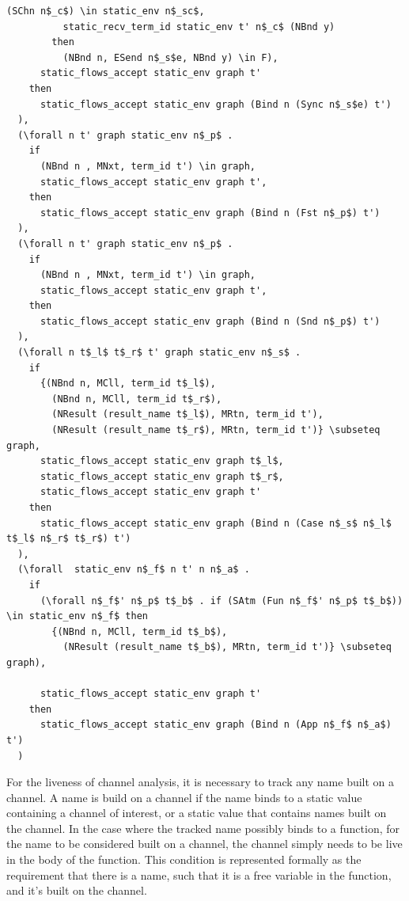 \documentclass[10pt]{article}
\begin{document}
\begin{lstlisting}[language=logic, mathescape]
          (SChn n$_c$) \in static_env n$_sc$,
          static_recv_term_id static_env t' n$_c$ (NBnd y)
        then
          (NBnd n, ESend n$_s$e, NBnd y) \in F),
      static_flows_accept static_env graph t'
    then
      static_flows_accept static_env graph (Bind n (Sync n$_s$e) t')
  ),
  (\forall n t' graph static_env n$_p$ .
    if
      (NBnd n , MNxt, term_id t') \in graph,
      static_flows_accept static_env graph t',
    then
      static_flows_accept static_env graph (Bind n (Fst n$_p$) t')
  ),
  (\forall n t' graph static_env n$_p$ .
    if
      (NBnd n , MNxt, term_id t') \in graph,
      static_flows_accept static_env graph t',
    then
      static_flows_accept static_env graph (Bind n (Snd n$_p$) t')
  ),
  (\forall n t$_l$ t$_r$ t' graph static_env n$_s$ .
    if
      {(NBnd n, MCll, term_id t$_l$),
        (NBnd n, MCll, term_id t$_r$),
        (NResult (result_name t$_l$), MRtn, term_id t'),
        (NResult (result_name t$_r$), MRtn, term_id t')} \subseteq graph,
      static_flows_accept static_env graph t$_l$,
      static_flows_accept static_env graph t$_r$,
      static_flows_accept static_env graph t'
    then
      static_flows_accept static_env graph (Bind n (Case n$_s$ n$_l$ t$_l$ n$_r$ t$_r$) t')
  ),
  (\forall  static_env n$_f$ n t' n n$_a$ .
    if
      (\forall n$_f$' n$_p$ t$_b$ . if (SAtm (Fun n$_f$' n$_p$ t$_b$)) \in static_env n$_f$ then 
        {(NBnd n, MCll, term_id t$_b$),
          (NResult (result_name t$_b$), MRtn, term_id t')} \subseteq graph),

      static_flows_accept static_env graph t'
    then
      static_flows_accept static_env graph (Bind n (App n$_f$ n$_a$) t')
  )
  \end{lstlisting}


For the liveness of channel analysis, it is necessary to track any name built on a channel.
A name is build on a channel if the name binds to a static value 
containing a channel of interest, or a static value that contains names built on the channel.
In the case where the tracked name possibly binds to a function,
for the name to be considered built on a channel,
the channel simply needs to be live in the body of the function.
This condition is represented formally as the requirement that there is a 
name, such that it is a free variable in the function, and it's built on the channel.
\end{document}
